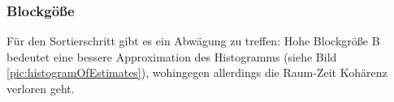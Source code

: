 \label{subsec:Blockgröße}
\subsubsection{Blockgöße}

Für den Sortierschritt gibt es ein Abwägung zu treffen: Hohe Blockgröße B bedeutet eine bessere Approximation 
des Histogramms (siehe Bild \ref{pic:histogramOfEstimates}), wohingegen allerdings die Raum-Zeit 
Kohärenz verloren geht.

\begin{figure}[H]



\end{figure}
